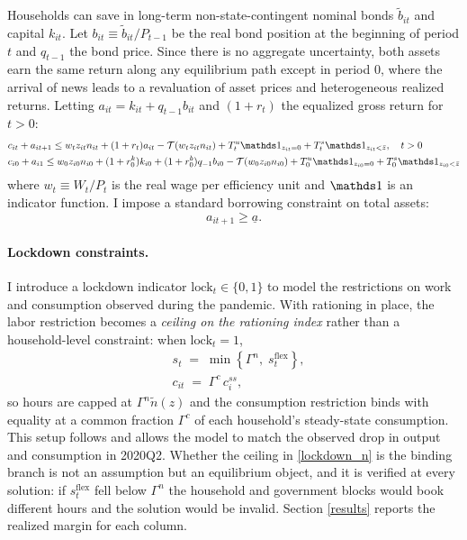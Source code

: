 Households can save in long-term non-state-contingent nominal bonds
$\tilde b_{it}$ and capital $k_{it}$. Let $b_{it}\equiv\tilde b_{it}/P_{t-1}$ be
the real bond position at the beginning of period $t$ and $q_{t-1}$ the bond
price. Since there is no aggregate uncertainty, both assets earn the same return
along any equilibrium path except in period $0$, where the arrival of news leads
to a revaluation of asset prices and heterogeneous realized returns. Letting
$a_{it}=k_{it}+q_{t-1}b_{it}$ and $(1+r_t)$ the equalized gross return for
$t>0$:
\begin{align}
    & c_{it} + a_{it+1} \leq  w_{t} z_{it} n_{it} + (1+r_t) a_{it} - \mathcal{T}(w_{t} z_{it} n_{it}) + T_{t}^u \Ind_{z_{it}=0} + T^s_{t} \Ind_{z_{it}<\bar z}, \quad t>0 \label{budget_constraint}\\
    & c_{i0} + a_{i1} \leq  w_0 z_{i0} n_{i0} + (1+r_0^k) k_{i0} + (1+r_0^b) q_{-1} b_{i0} - \mathcal{T}(w_{0} z_{i0} n_{i0}) + T_{0}^u \Ind_{z_{i0}=0} + T^s_{0} \Ind_{z_{i0}<\bar z}
    \label{budget_constraint_t0}
\end{align}
where $w_t\equiv W_t/P_t$ is the real wage per efficiency unit and $\Ind$ is an
indicator function. I impose a standard borrowing constraint on total assets:
\begin{equation}\label{borrowing_constraint}
  a_{it+1}\geq \underline{a}.
\end{equation}

\paragraph{Lockdown constraints.} I introduce a lockdown indicator
$\text{lock}_t\in\{0,1\}$ to model the restrictions on work and consumption
observed during the pandemic. With rationing in place, the labor restriction
becomes a \emph{ceiling on the rationing index} rather than a household-level
constraint: when $\text{lock}_t=1$,
\begin{align}
& s_t \;=\; \min\!\left\{\Gamma^n,\; s^{\text{flex}}_t\right\}, \label{lockdown_n}\\
& c_{it} \;=\; \Gamma^c\, c^{ss}_i, \label{lockdown_c}
\end{align}
so hours are capped at $\Gamma^n\tilde n(z)$ and the consumption restriction
binds with equality at a common fraction $\Gamma^c$ of each household's
steady-state consumption. This setup follows \textcite{Fourakis-2024} and allows
the model to match the observed drop in output and consumption in 2020Q2.
Whether the ceiling in \eqref{lockdown_n} is the binding branch is not an
assumption but an equilibrium object, and it is verified at every solution: if
$s^{\text{flex}}_t$ fell below $\Gamma^n$ the household and government blocks
would book different hours and the solution would be invalid. Section
\ref{results} reports the realized margin for each column.

